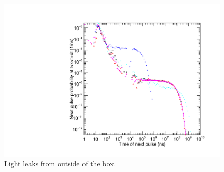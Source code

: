 \documentclass[a4paper, 11pt]{report}%
\begin{document}
  \begin{figure}[!hbtp]
    \centering
    \includegraphics[totalheight=0.7\textwidth,trim=0cm 0cm 1.6cm 0.9cm, clip=true]{../Pictures/DTimeLightLeakAug5.pdf} 
    \caption{Light leaks from outside of the box.}
    \label{fig:light_leaks}
  \end{figure}
  
   
\end{document}
